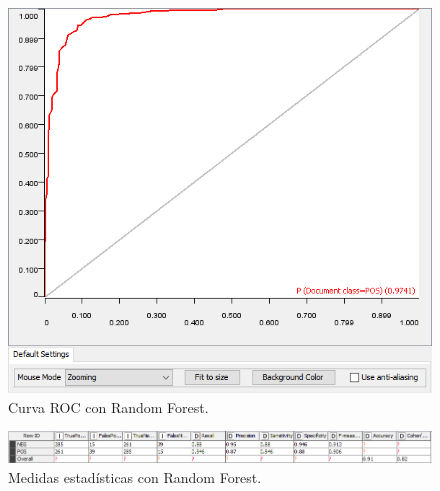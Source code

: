 \begin{figure}[t]
    \center\includegraphics[width=.95\linewidth]{img/classification/rocRF.png}
    \caption{Curva ROC con Random Forest.}
\end{figure}


\begin{figure}[t]
    \center\includegraphics[width=.95\linewidth]{img/classification/scoresRF.png}
    \caption{Medidas estadísticas con Random Forest.}
\end{figure}